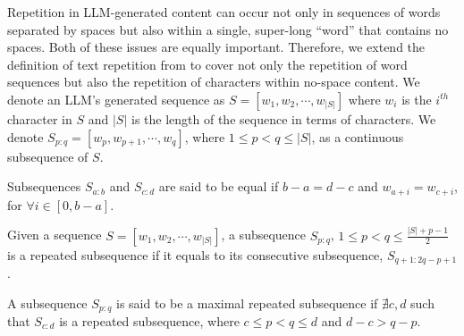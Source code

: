 

Repetition in LLM-generated content can occur not only in sequences of words separated by spaces but also within a single, super-long ``word'' that contains no spaces. Both of these issues are equally important. Therefore, we extend the definition of text repetition from \citet{Fu2020ATA} to cover not only the repetition of word sequences but also the repetition of characters within no-space content. 
%
We denote an LLM's generated sequence as $S=[w_1, w_2, \cdots, w_{|S|}]$ where $w_i$ is the $i^{th}$ character in $S$ and $|S|$ is the length of the sequence in terms of characters. We denote $S_{p:q}=[w_p, w_{p+1}, \cdots, w_{q}]$, where $1\leq p < q \leq |S|$, as a continuous subsequence of $S$. 

\begin{theorem}
\label{def:equal_sub}
Subsequences $S_{a:b}$ and $S_{c:d}$ are said to be equal if $b-a = d-c$ and $w_{a+i}=w_{c+i}$, for $\forall i \in [0, b-a]$. 
\end{theorem}

\begin{theorem}
\label{def:rep_sub}
Given a sequence $S=[w_1, w_2, \cdots, w_{|S|}]$, a subsequence $S_{p:q}$, $1 \leq p < q \leq \frac{|S|+p-1}{2}$ is a repeated subsequence if it equals to its consecutive subsequence, $S_{q+1:2q-p+1}$.
\end{theorem}

\begin{theorem}
\label{def:rep_sub}
A subsequence $S_{p:q}$ is said to be a maximal repeated subsequence if $\nexists c, d$ such that $S_{c:d}$ is a repeated subsequence, where $c \leq p < q \leq d$ and $d-c > q-p$.
\end{theorem}

